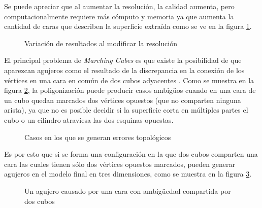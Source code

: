 Se puede apreciar que al aumentar la resolución, la calidad aumenta, pero
computacionalmente requiere más cómputo y memoria ya que aumenta la cantidad de caras que
describen la superficie extraída como se ve en la figura \ref{f:estadoDelArte:polygonise3}.

\begin{figure}[!ht]
\centering
\caption{Variación de resultados al modificar la resolución}
\label{f:estadoDelArte:polygonise3}
\end{figure}

El principal problema de \emph{Marching Cubes} es que existe la posibilidad de que aparezcan agujeros como el resultado de la discrepancia en la conexión de los vértices en una cara en común de dos cubos adyacentes \cite{Chernyaev95marchingcubes}. Como se muestra en la figura \ref{f:estadoDelArte:Bloomenthal88polygonizationof_1}, la poligonización puede producir casos ambigüos cuando en una cara de un cubo quedan marcados dos vértices opuestos (que no comparten ninguna arista), ya que no es posible decidir si la superficie corta en múltiples partes el cubo o un cilindro atraviesa las dos esquinas opuestas.

\begin{figure}[t]
\centering
\caption{Casos en los que se generan errores topológicos}
\label{f:estadoDelArte:Bloomenthal88polygonizationof_1}
\end{figure}

Es por esto que si se forma una configuración en la que dos cubos comparten una cara las cuales tienen sólo dos vértices opuestos marcados, pueden generar agujeros en el modelo final en tres dimensiones, como se muestra en la figura \ref{f:estadoDelArte:Chernyaev95marchingcubes_1}.

\begin{figure}[!htb]
\centering
\caption[Un agujero causado por una cara con ambigüedad compartida por dos cubos]{Un agujero causado por una cara con ambigüedad compartida por dos cubos \cite{Chernyaev95marchingcubes}}
\label{f:estadoDelArte:Chernyaev95marchingcubes_1}
\end{figure}

